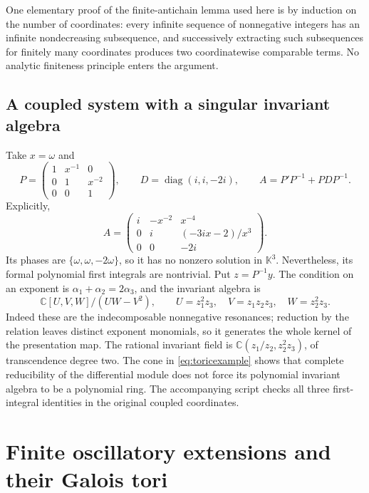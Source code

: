 \documentclass[11pt,a4paper]{article}
\numberwithin{equation}{section}
\theoremstyle{definition}
\theoremstyle{remark}
\newcommand{\K}{\mathbb K}
\newcommand{\C}{\mathbb C}
\newcommand{\diag}{\operatorname{diag}}
\begin{document}
One elementary proof of the finite-antichain lemma used here is by
induction on the number of coordinates: every infinite sequence of
nonnegative integers has an infinite nondecreasing subsequence, and
successively extracting such subsequences for finitely many coordinates
produces two coordinatewise comparable terms. No analytic finiteness
principle enters the argument.

\subsection{A coupled system with a singular invariant algebra}
Take $x=\omega$ and
\[
 P=\begin{pmatrix}1&x^{-1}&0\\0&1&x^{-2}\\0&0&1\end{pmatrix},
 \qquad D=\diag(i,i,-2i),\qquad A=P'P^{-1}+PDP^{-1}.
\]
Explicitly,
\begin{equation}\label{eq:3matrix}
 A=\begin{pmatrix}
 i&-x^{-2}&x^{-4}\\
 0&i&(-3ix-2)/x^3\\
 0&0&-2i
 \end{pmatrix}.
\end{equation}
Its phases are $\{\omega,\omega,-2\omega\}$, so it has no nonzero solution
in $\K^3$. Nevertheless, its formal polynomial first integrals are
nontrivial. Put $z=P^{-1}y$. The condition on an exponent is
$\alpha_1+\alpha_2=2\alpha_3$, and the invariant algebra is
\begin{equation}\label{eq:toricexample}
 \C[U,V,W]/(UW-V^2),\qquad
 U=z_1^2z_3,\quad V=z_1z_2z_3,\quad W=z_2^2z_3.
\end{equation}
Indeed these are the indecomposable nonnegative resonances; reduction by
the relation leaves distinct exponent monomials, so it generates the whole
kernel of the presentation map. The rational invariant field is
$\C(z_1/z_2,z_2^2z_3)$, of transcendence degree two. The cone in
\eqref{eq:toricexample} shows that complete reducibility of the differential
module does not force its polynomial invariant algebra to be a polynomial
ring. The accompanying script checks all three first-integral identities
in the original coupled coordinates.

\section{Finite oscillatory extensions and their Galois tori}\label{sec:galois}
\end{document}
